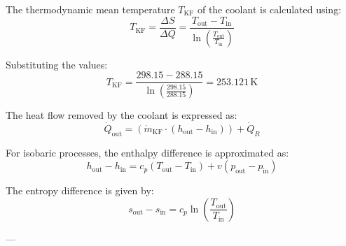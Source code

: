 The thermodynamic mean temperature \( T_{\text{KF}} \) of the coolant is calculated using:  
\[
T_{\text{KF}} = \frac{\Delta S}{\Delta Q} = \frac{T_{\text{out}} - T_{\text{in}}}{\ln \left( \frac{T_{\text{out}}}{T_{\text{in}}} \right)}
\]  

Substituting the values:  
\[
T_{\text{KF}} = \frac{298.15 - 288.15}{\ln \left( \frac{298.15}{288.15} \right)} = 253.121 \, \text{K}
\]  

The heat flow removed by the coolant is expressed as:  
\[
\dot{Q}_{\text{out}} = (\dot{m}_{\text{KF}} \cdot (h_{\text{out}} - h_{\text{in}})) + \dot{Q}_R
\]  

For isobaric processes, the enthalpy difference is approximated as:  
\[
h_{\text{out}} - h_{\text{in}} = c_p (T_{\text{out}} - T_{\text{in}}) + v (p_{\text{out}} - p_{\text{in}})
\]  

The entropy difference is given by:  
\[
s_{\text{out}} - s_{\text{in}} = c_p \ln \left( \frac{T_{\text{out}}}{T_{\text{in}}} \right)
\]  

---